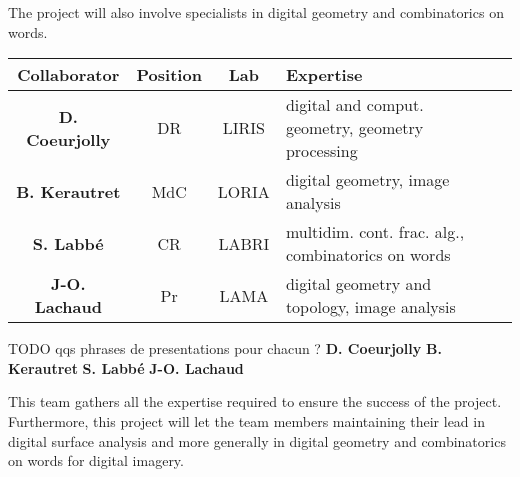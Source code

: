 The project will also involve specialists in digital geometry and combinatorics on words. 
\begin{table}[h]
\small
\centering
\begin{tabular}{|ccclcc|}
\hline
Collaborator & Position & Lab & Expertise \\ \hline
\hline
\textbf{D. Coeurjolly} & DR & LIRIS & digital and comput. geometry, geometry processing \\ \hline
\textbf{B. Kerautret} & MdC & LORIA & digital geometry, image analysis \\ \hline
\textbf{S. Labb\'{e}} & CR & LABRI & multidim. cont. frac. alg., combinatorics on words \\ \hline
\textbf{J-O. Lachaud} & Pr & LAMA & digital geometry and topology, image analysis \\ \hline
\hline
\end{tabular}
\normalsize
\end{table}

TODO qqs phrases de presentations pour chacun ?
\textbf{D. Coeurjolly} 
\textbf{B. Kerautret} 
\textbf{S. Labb\'{e}} 
\textbf{J-O. Lachaud}


This team gathers all the expertise required to ensure the success of the project.
Furthermore, this project will let the team members maintaining their lead in digital surface analysis 
and more generally in digital geometry and combinatorics on words for digital imagery. 


